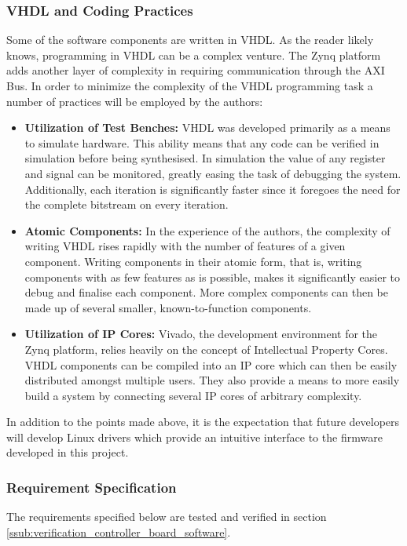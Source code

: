 \subsubsection{VHDL and Coding Practices} %
\label{ssub:vhdl_and_coding_practices}
Some of the software components are written in VHDL.
As the reader likely knows, programming in VHDL can be a complex venture.
The Zynq platform adds another layer of complexity in requiring communication through the AXI Bus.
In order to minimize the complexity of the VHDL programming task a number of practices will be employed by the authors:
\begin{itemize}
	\item \textbf{Utilization of Test Benches:} VHDL was developed primarily as a means to simulate hardware.
	This ability means that any code can be verified in simulation before being synthesised.
	In simulation the value of any register and signal can be monitored, greatly easing the task of debugging the system.
	Additionally, each iteration is significantly faster since it foregoes the need for the complete bitstream on every iteration.
	\item \textbf{Atomic Components:} In the experience of the authors, the complexity of writing VHDL rises rapidly with the number of features of a given component.
	Writing components in their atomic form, that is, writing components with as few features as is possible, makes it significantly easier to debug and finalise each component.
	More complex components can then be made up of several smaller, known-to-function components.
	\item \textbf{Utilization of IP Cores:} Vivado, the development environment for the Zynq platform, relies heavily on the concept of Intellectual Property Cores.
	VHDL components can be compiled into an IP core which can then be easily distributed amongst multiple users.
	They also provide a means to more easily build a system by connecting several IP cores of arbitrary complexity.
\end{itemize}
In addition to the points made above, it is the expectation that future developers will develop Linux drivers which provide an intuitive interface to the firmware developed in this project.

\subsubsection{Requirement Specification} %
\label{ssub:controller_requirements}
The requirements specified below are tested and verified in section \ref{ssub:verification_controller_board_software}.
